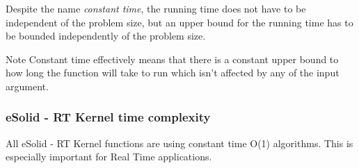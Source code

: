 Despite the name {\itshape constant time}, the running time does not have to be independent of the problem size, but an upper bound for the running time has to be bounded independently of the problem size.

\begin{DoxyNote}{Note}
Constant time effectively means that there is a constant upper bound to how long the function will take to run which isn’t affected by any of the input argument.
\end{DoxyNote}
\hypertarget{time_complexity_tc_esolid}{}\subsubsection{e\-Solid -\/ R\-T Kernel time complexity}\label{time_complexity_tc_esolid}
All e\-Solid -\/ R\-T Kernel functions are using {\ttfamily constant time O(1)} algorithms. This is especially important for Real Time applications. 